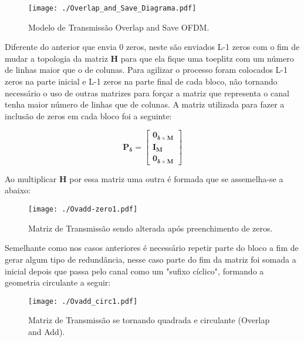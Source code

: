 \documentclass[a4paper,twoside]{articlewithlogo}
\begin{document}
\begin{figure}[H]
	\begin{center}	
		\texttt{[image: ./Overlap\_and\_Save\_Diagrama.pdf]}
		\caption{Modelo de Transmissão Overlap and Save OFDM.}
		\label{fig:Overlap_and_Save_Diagrama}
	\end{center}
\end{figure}


Diferente do anterior que envia 0 zeros, neste são enviados L-1 zeros com o fim de mudar a topologia da matriz $\mathbf{H}$ para que ela fique uma toeplitz com um número de linhas maior que o de colunas. Para agilizar o processo foram colocados L-1 zeros na parte inicial e L-1 zeros na parte final de cada bloco, não tornando necessário o uso de outras matrizes para forçar a matriz que representa o canal tenha maior número de linhas que de colunas.
A matriz utilizada para fazer a inclusão de zeros em cada bloco foi a seguinte:

\begin{equation*}
\mathbf{P_\delta}=
\left[
\begin{array}{c}
\mathbf{0_{\delta \times M}} \\
\mathbf{I_{M}}\\
\mathbf{0_{\delta \times M}}  
\end{array}
\right]
\end{equation*}

Ao multiplicar $\mathbf{H}$ por essa matriz uma outra é formada que se assemelha-se a abaixo:


\begin{figure}[H]
	\begin{center}	
		\texttt{[image: ./Ovadd-zero1.pdf]}
		\caption{Matriz de Transmissão sendo alterada após preenchimento de zeros.}
		\label{fig:Ovadd-zero}
	\end{center}
\end{figure}

Semelhante como nos casos anteriores é necessário repetir parte do bloco a fim de gerar algum tipo de redundância, nesse caso parte do fim da matriz foi somada a inicial depois que passa pelo canal como um "sufixo cíclico", formando a geometria circulante a seguir:

\begin{figure}[H]
	\begin{center}	
		\texttt{[image: ./Ovadd\_circ1.pdf]}
		\caption{Matriz de Transmissão se tornando quadrada e circulante (Overlap and Add).}
		\label{fig:Ovadd_circ}
	\end{center}
\end{figure}
\end{document}
